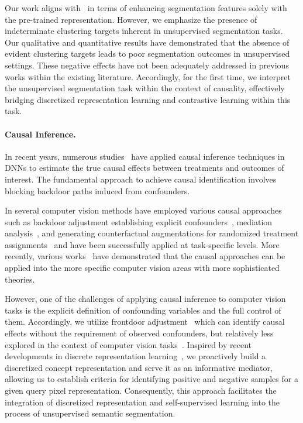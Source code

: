 \documentclass{article} \usepackage{iclr2024_conference,times}
\begin{document}
Our work aligns with~\citet{hamilton2022unsupervised, seong2023leveraging} in terms of enhancing segmentation features solely with the pre-trained representation. However, we emphasize the presence of indeterminate clustering targets inherent in unsupervised segmentation tasks. Our qualitative and quantitative results have demonstrated that the absence of evident clustering targets leads to poor segmentation outcomes in unsupervised settings. These negative effects have not been adequately addressed in previous works within the existing literature. Accordingly, for the first time, we interpret the unsupervised segmentation task within the context of causality, effectively bridging discretized representation learning and contrastive learning within this task.


\paragraph{Causal Inference.} In recent years, numerous studies~\citep{wang2020visual, zhang2020devlbert, scholkopf2021toward, lv2022causality} have applied causal inference techniques in DNNs to estimate the true causal effects between treatments and outcomes of interest. The fundamental approach to achieve causal identification involves blocking backdoor paths induced from confounders. 

In several computer vision methods have employed various causal approaches such as backdoor adjustment establishing explicit confounders~\citep{tang2020long,zhang2020causal,yue2020interventional,liu2022show}, mediation analysis~\citep{tang2020unbiased, niu2021counterfactual}, and generating counterfactual augmentations for randomized treatment assignments~\citep{agarwal2020towards, yue2021counterfactual,wang2022out} and have been successfully applied at task-specific levels. More recently, various works~\citep{kim2023demystifying, lee2023mitigating} have demonstrated that the causal approaches can be applied into the more specific computer vision areas with more sophisticated theories. 

However, one of the challenges of applying causal inference to computer vision tasks is the explicit definition of confounding variables and the full control of them. Accordingly, we utilize frontdoor adjustment~\citep{pearl1995causal} which can identify causal effects without the requirement of observed confounders, but relatively less explored in the context of computer vision tasks~\citep{yang2021causal, yang2021deconfounded}. Inspired by recent developments in discrete representation learning~\citep{van2017neural, esser2021taming}, we proactively build a discretized concept representation and serve it as an informative mediator, allowing us to establish criteria for identifying positive and negative samples for a given query pixel representation. Consequently, this approach facilitates the integration of discretized representation and self-supervised learning into the process of unsupervised semantic segmentation.
\end{document}
